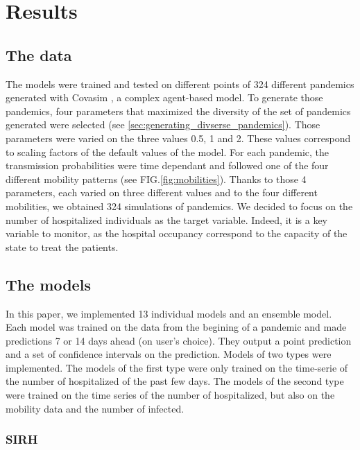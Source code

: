 \section*{Results}


\subsection{The data}

The models were trained and tested on different points of 324 different pandemics generated with Covasim \cite*{kerr2021covasim}, a complex agent-based model. 
To generate those pandemics, four parameters that maximized the diversity of the set of pandemics generated were selected (see \ref{sec:generating_divserse_pandemics}). 
Those parameters were varied on the three values 0.5, 1 and 2. 
These values correspond to scaling factors of the default values of the model. 
For each pandemic, the transmission probabilities were time dependant and followed one of the four different mobility patterns (see FIG.\ref{fig:mobilities}). 
Thanks to those 4 parameters, each varied on three different values and to the four different mobilities, we obtained 324 simulations of pandemics. 
We decided to focus on the number of hospitalized individuals as the target variable. 
Indeed, it is a key variable to monitor, as the hospital occupancy correspond to the capacity of the state to treat the patients. 


\subsection*{The models}

In this paper, we implemented 13 individual models and an ensemble model.
Each model was trained on the data from the begining of a pandemic and made predictions 7 or 14 days ahead (on user's choice).
They output a point prediction and a set of confidence intervals on the prediction. 
Models of two types were implemented. 
The models of the first type were only trained on the time-serie of the number of hospitalized of the past few days. 
The models of the second type were trained on the time series of the number of hospitalized, but also on the mobility data and the number of infected. 

\subsubsection{SIRH}

